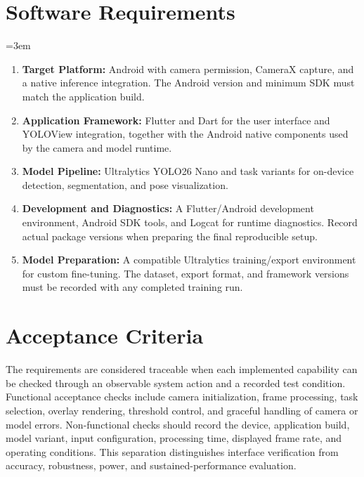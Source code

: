 \section{Software Requirements}\label{sec:software}
\begingroup\emergencystretch=3em
  \begin{enumerate}[label=\roman*.]
    \item \textbf{Target Platform:} Android with camera permission, CameraX capture, and a native
      inference integration. The Android version and minimum SDK must match the application build.
    \item \textbf{Application Framework:} Flutter and Dart for the user interface and YOLOView
      integration, together with the Android native components used by the camera and model runtime.
    \item \textbf{Model Pipeline:} Ultralytics YOLO26 Nano and task variants for on-device detection,
      segmentation, and pose visualization.
    \item \textbf{Development and Diagnostics:} A Flutter/Android development environment, Android
      SDK tools, and Logcat for runtime diagnostics. Record actual package versions when preparing
      the final reproducible setup.
    \item \textbf{Model Preparation:} A compatible Ultralytics training/export environment for
      custom fine-tuning. The dataset, export format, and framework versions must be recorded with
      any completed training run.
  \end{enumerate}
\endgroup
\label{end:software}

\section{Acceptance Criteria}\label{sec:acceptance}
The requirements are considered traceable when each implemented capability can be checked through
an observable system action and a recorded test condition. Functional acceptance checks include
camera initialization, frame processing, task selection, overlay rendering, threshold control, and
graceful handling of camera or model errors. Non-functional checks should record the device,
application build, model variant, input configuration, processing time, displayed frame rate, and
operating conditions. This separation distinguishes interface verification from accuracy,
robustness, power, and sustained-performance evaluation.
\label{end:acceptance}\label{end:requirements}
